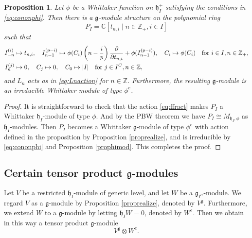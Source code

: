 \documentclass[12pt, reqno]{amsart}
\numberwithin{equation}{section}
\newtheorem{proposition}[theorem]{Proposition}%
\numberwithin{equation}{section}
\def\h{\mathfrak{h}}
\def\g{\mathfrak{g}}
\newcommand{\C}{\mathbb C}
\newcommand{\Z}{\mathbb{Z}}
\begin{document}
\begin{proposition} \label{prop:FFR}
 Let $\phi$ be a Whittaker function on $\h_I^+$  satisfying the conditions in \eqref{eq:cononphi}.
 Then there is a $\g$-module structure on the polynomial ring
 \[
  P_I=\C[t_{n,i}\mid n\in \Z_+, i\in I]
 \]
 such that
 \begin{align} \label{eq:ffract}
    I_{-n}^{(i)}&\mapsto t_{n,i},\quad I_{n-1}^{(p-i)}\mapsto \phi(C_i)\left(n-\frac{i}{p}\right)
     \frac{\partial}{\partial t_{n,i}}+\phi(I_{n-1}^{(p-i)}),\quad
     C_i\mapsto \phi(C_i)\quad\text{for}\ i\in I, n\in \Z_+,\\
     I_n^{(j)}&\mapsto 0,\quad C_j\mapsto 0,\quad C_0\mapsto |I|\quad
     \text{for}\ j\in I^C, n\in \Z, \notag
 \end{align}
 and $L_n$ acts as in \eqref{eq:Lnaction} for $n\in \Z$.
 Furthermore, the resulting $\g$-module  is an irreducible Whittaker module of type $\phi^e$.
\end{proposition}
\begin{proof}
 It is straightforward to check that the action \eqref{eq:ffract} makes $P_I$ a Whittaker $\h_I$-module of type $\phi$.
 And by the PBW theorem we have $P_I\cong M_{\h_I,\phi}$ as $\h_I$-modules.
 Then $P_I$ becomes a Whittaker $\g$-module of type $\phi^e$ with action defined in the proposition by Proposition \ref{proprealize}, and is irreducible by \eqref{eq:cononphi} and Proposition \ref{prophimod}.
 This completes the proof.
\end{proof}

\subsection{Certain tensor product  $\g$-modules}\label{subsec:tengmod}
Let $V$ be a restricted $\h_I$-module of generic level, and let $W$ be a $\g_{I^C}$-module.
We regard $V$ as a $\g$-module by Proposition \ref{proprealize}, denoted by $V^{\g}$.
Furthermore, we extend $W$ to a $\g$-module by letting $\h_I W=0$, denoted by $W^e$.
Then we obtain in this way a tensor product $\g$-module
\[
 V^{\g}\otimes W^e.
\]
\end{document}

